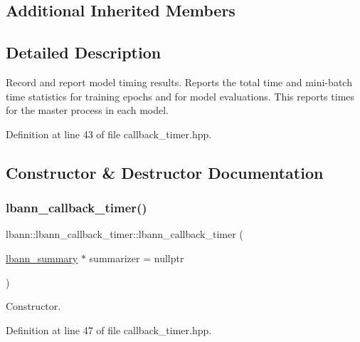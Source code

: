 \subsection*{Additional Inherited Members}


\subsection{Detailed Description}
Record and report model timing results. Reports the total time and mini-\/batch time statistics for training epochs and for model evaluations. This reports times for the master process in each model. 

Definition at line 43 of file callback\+\_\+timer.\+hpp.



\subsection{Constructor \& Destructor Documentation}
\mbox{\label{classlbann_1_1lbann__callback__timer_a00fc86ddf14a4a5e9c6b65ff2e81dfb6}} 
\subsubsection{\texorpdfstring{lbann\+\_\+callback\+\_\+timer()}{lbann\_callback\_timer()}\hspace{0.1cm}{\footnotesize\ttfamily [1/2]}}
{\footnotesize\ttfamily lbann\+::lbann\+\_\+callback\+\_\+timer\+::lbann\+\_\+callback\+\_\+timer (\begin{DoxyParamCaption}\item[{\hyperlink{classlbann_1_1lbann__summary}{lbann\+\_\+summary} $\ast$}]{summarizer = {\ttfamily nullptr} }\end{DoxyParamCaption})\hspace{0.3cm}{\ttfamily [inline]}}

Constructor. 

Definition at line 47 of file callback\+\_\+timer.\+hpp.


